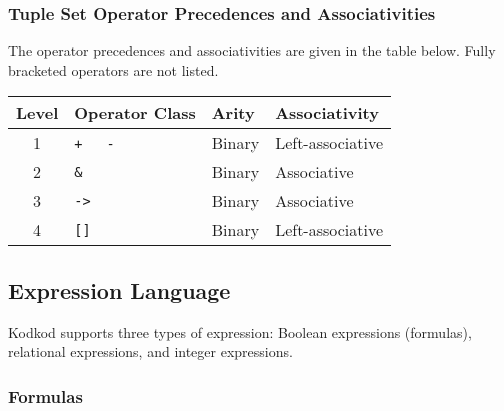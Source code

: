 \documentclass[a4paper,12pt]{article}
\begin{document}
    \subsubsection{Tuple Set Operator Precedences and Associativities}
    \label{tuple-set-operator-precedences-and-associativities}

    The operator precedences and associativities are given in the table below. Fully
    bracketed operators are not listed.

    \begin{center}
        \small
        \begin{supertabular}{c|l|l|l} %
            Level & Operator Class & Arity & Associativity \\[.4ex]
            \hline
            \strut{}%
            1 & \verb|+|~~~\verb|-| & Binary & Left-associative\bigstrut \\
            2 & \verb|&| & Binary & Associative\bigstrut \\
            3 & \verb|->| & Binary & Associative\bigstrut \\
            4 & \verb|[]| & Binary & Left-associative\bigstrut \\
        \end{supertabular}
    \end{center}

    \subsection{Expression Language}
    \label{expression-language}

    Kodkod supports three types of expression: Boolean expressions (formulas),
    relational expressions, and integer expressions.

    \subsubsection{Formulas}
    \label{formulas}
\end{document}
